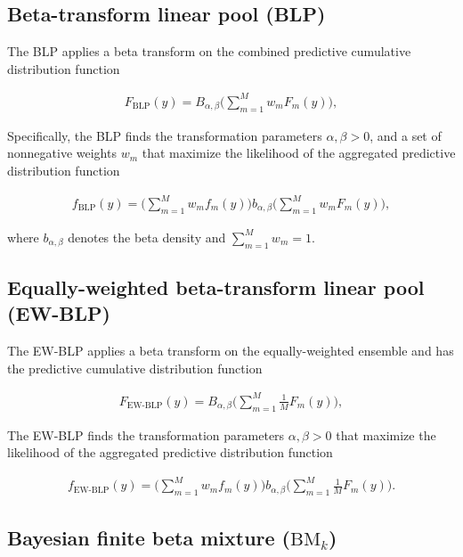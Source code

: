 \documentclass[
]{article}
\begin{document}
\hypertarget{beta-transform-linear-pool-blp}{%
\subsection{Beta-transform linear pool
(BLP)}\label{beta-transform-linear-pool-blp}}

The BLP applies a beta transform on the combined predictive cumulative
distribution function

\begin{align}
F_{\text{BLP}}(y)=B_{\alpha,\beta}\Big(\sum_{m=1}^M w_m F_m(y)\Big),
\end{align}

Specifically, the BLP finds the transformation parameters
\(\alpha,\beta > 0\), and a set of nonnegative weights \(w_m\) that
maximize the likelihood of the aggregated predictive distribution
function

\begin{align}
f_{\text{BLP}}(y)=\Big(\sum_{m=1}^M w_mf_m(y)\Big)b_{\alpha,\beta}\Big(\sum_{m=1}^M w_m F_m(y)\Big),
\end{align}

where \(b_{\alpha,\beta}\) denotes the beta density and
\(\sum_{m=1}^M w_m=1\).

\hypertarget{equally-weighted-beta-transform-linear-pool-ew-blp}{%
\subsection{Equally-weighted beta-transform linear pool
(EW-BLP)}\label{equally-weighted-beta-transform-linear-pool-ew-blp}}

The EW-BLP applies a beta transform on the equally-weighted ensemble and
has the predictive cumulative distribution function

\begin{align}
F_{\text{EW-BLP}}(y)=B_{\alpha,\beta}\Big(\sum_{m=1}^M \frac{1}{M} F_m(y)\Big),
\end{align}

The EW-BLP finds the transformation parameters \(\alpha,\beta > 0\) that
maximize the likelihood of the aggregated predictive distribution
function

\begin{align}
f_{\text{EW-BLP}}(y)=\Big(\sum_{m=1}^M w_mf_m(y)\Big)b_{\alpha,\beta}\Big(\sum_{m=1}^M \frac{1}{M} F_m(y)\Big).
\end{align}

\hypertarget{bayesian-finite-beta-mixture-textbm_k}{%
\subsection{\texorpdfstring{Bayesian finite beta mixture
(\(\text{BM}_k\))}{Bayesian finite beta mixture (\textbackslash text\{BM\}\_k)}}\label{bayesian-finite-beta-mixture-textbm_k}}
\end{document}
